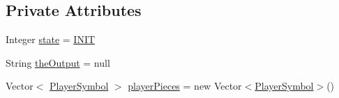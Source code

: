 \subsection*{Private Attributes}
\begin{DoxyCompactItemize}
\item 
Integer \hyperlink{class_monopoly_1_1_server_1_1_game_protocol_ad96dd410c80756d63c446a70222dec2d}{state} = \hyperlink{class_monopoly_1_1_server_1_1_game_protocol_a3a3f1fded8c4f1f318e17e12ab184611}{I\+N\+IT}
\item 
String \hyperlink{class_monopoly_1_1_server_1_1_game_protocol_afaecc9cd9817c18344dab5603c7b4696}{the\+Output} = null
\item 
Vector$<$ \hyperlink{class_monopoly_1_1_logic_1_1_player_symbol}{Player\+Symbol} $>$ \hyperlink{class_monopoly_1_1_server_1_1_game_protocol_a8fb151d3b8550a9d379c21159eae6585}{player\+Pieces} = new Vector$<$\hyperlink{class_monopoly_1_1_logic_1_1_player_symbol}{Player\+Symbol}$>$()
\end{DoxyCompactItemize}
